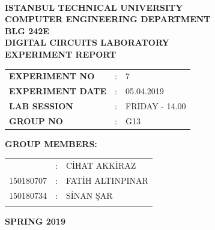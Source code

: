 \documentclass[pdftex,12pt,a4paper]{article}
\begin{document}
\begin{titlepage}
\begin{center}
\textbf{}\\
\textbf{\Large{ISTANBUL TECHNICAL UNIVERSITY}}\\
\vspace{0.5cm}
\textbf{\Large{COMPUTER ENGINEERING DEPARTMENT}}\\
\vspace{2cm}
\textbf{\Large{BLG 242E\\ DIGITAL CIRCUITS LABORATORY\\ EXPERIMENT REPORT}}\\
\vspace{2.8cm}
\begin{table}[ht]
\centering
\Large{
\begin{tabular}{lcl}
\textbf{EXPERIMENT NO}  & : & 7 \\
\textbf{EXPERIMENT DATE}  & : & 05.04.2019 \\
\textbf{LAB SESSION}  & : & FRIDAY - 14.00 \\
\textbf{GROUP NO}  & : & G13 \\
\end{tabular}}
\end{table}
\vspace{1cm}
\textbf{\Large{GROUP MEMBERS:}}\\
\begin{table}[ht]
\centering
\Large{
\begin{tabular}{rcl}
{
150180704  & : & C\.{I}HAT AKK\.{I}RAZ \\
150180707  & : & FAT\.{I}H ALTINPINAR \\
150180734  & : & S\.{I}NAN \c{S}AR \\
}
\end{tabular}}
\end{table}
\vspace{2.8cm}
\textbf{\Large{SPRING 2019}}

\end{center}

\end{titlepage}

\newpage
\newpage

\thispagestyle{empty}
\setcounter{tocdepth}{4}
\tableofcontents
\clearpage
\end{document}

